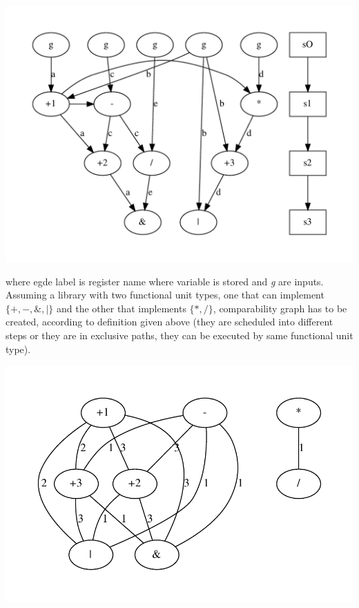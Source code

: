 \begin{DoxyImageNoCaption}
  \mbox{\includegraphics[width=\textwidth,height=\textheight/2,keepaspectratio=true]{dot_inline_dotgraph_12}}
\end{DoxyImageNoCaption}
 where egde label is register name where variable is stored and {\itshape g} are inputs.~\newline
 Assuming a library with two functional unit types, one that can implement $ \lbrace +,-,\&,\mid \rbrace $ and the other that implements $ \lbrace *,/ \rbrace $, comparability graph has to be created, according to definition given above (they are scheduled into different steps or they are in exclusive paths, they can be executed by same functional unit type). 
\begin{DoxyImageNoCaption}
  \mbox{\includegraphics[width=\textwidth,height=\textheight/2,keepaspectratio=true]{dot_inline_dotgraph_13}}
\end{DoxyImageNoCaption}
